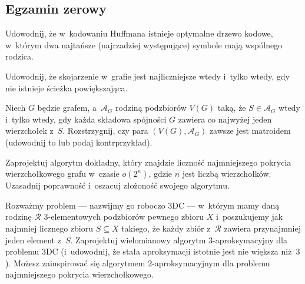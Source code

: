 \subsection{Egzamin zerowy}

\begin{zadanie}
	Udowodnij, że w~kodowaniu Huffmana istnieje optymalne drzewo kodowe,
	w~którym dwa najtańsze (najrzadziej występujące) symbole mają wspólnego
	rodzica.
\end{zadanie}

\begin{zadanie}
	Udowodnij, że skojarzenie w~grafie jest najliczniejsze wtedy i~tylko wtedy,
	gdy nie istnieje ścieżka powiększająca.
\end{zadanie}

\begin{zadanie}
	Niech $G$ będzie grafem, a~$\mathcal{A}_G$ rodziną podzbiorów $V(G)$ taką, że
	$S\in\mathcal{A}_G$ wtedy i~tylko wtedy, gdy każda składowa spójności $G$
	zawiera co najwyżej jeden wierzchołek z~$S$. Rozstrzygnij, czy para
	$(V(G),\mathcal{A}_G)$ zawsze jest matroidem (udowodnij to lub podaj
	kontrprzykład).
\end{zadanie}

\begin{zadanie}
	Zaprojektuj algorytm dokładny, który znajdzie liczność najmniejszego pokrycia
	wierzchołkowego grafu w~czasie $o(2^n)$, gdzie $n$ jest liczbą wierzchołków.
	Uzasadnij poprawność i~oszacuj złożoność swojego algorytmu.
\end{zadanie}

\begin{zadanie}
	Rozważmy problem --- nazwijmy go roboczo 3DC --- w~którym mamy daną rodzinę
	$\mathcal{R}$ 3-elementowych podzbiorów pewnego zbioru $X$ i~poszukujemy jak
	najmniej licznego zbioru $S\subseteq X$ takiego, że każdy zbiór z~$\mathcal{R}$
	zawiera przynajmniej jeden element z~$S$. Zaprojektuj wielomianowy algorytm
	$3$-aproksymacyjny dla problemu 3DC (i~udowodnij, że stała aproksymacji
	istotnie jest nie większa niż~$3$). Możesz zainspirować się algorytmem
	$2$-aproksymacyjnym dla problemu najmniejszego pokrycia wierzchołkowego.
\end{zadanie}
